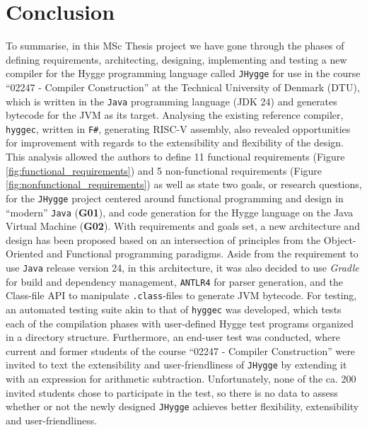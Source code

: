 \chapter{Conclusion}

To summarise, in this MSc Thesis project we have gone through the phases of defining requirements, architecting, designing, implementing
and testing a new compiler for the Hygge programming language called \texttt{JHygge} for use in the course ``02247 - Compiler Construction''\cite{curriculum_02247}
at the Technical University of Denmark (DTU), which is written in the \texttt{Java} programming
language (JDK 24) and generates bytecode for the JVM as its target. Analysing the existing reference compiler, \texttt{hyggec}, written in
\texttt{F\#}, generating RISC-V assembly, also revealed opportunities for improvement with regards to the extensibility and flexibility
of the design. This analysis allowed the authors to define 11 functional requirements (Figure \ref{fig:functional_requirements}) and
5 non-functional requirements (Figure \ref{fig:nonfunctional_requirements}) as well as state two goals, or research questions, for
the \texttt{JHygge} project centered around functional programming and design in ``modern'' \texttt{Java} (\textbf{G01}), and code generation
for the Hygge language on the Java Virtual Machine (\textbf{G02}). With requirements and goals set, a new architecture and design has been proposed
based on an intersection of principles from the Object-Oriented and Functional programming paradigms. Aside from the requirement to use \texttt{Java}
release version 24, in this architecture, it was also decided to use \textit{Gradle}\cite{gradle} for build and dependency management, \texttt{ANTLR4}\cite{antlr4}
for parser generation, and the Class-file API\cite{jep484} to manipulate \texttt{.class}-files to generate JVM bytecode. For testing, an automated
testing suite akin to that of \texttt{hyggec}\cite{hyggec} was developed, which tests each of the compilation phases with user-defined Hygge test
programs organized in a directory structure. Furthermore, an end-user test was conducted, where current and former students of the course
``02247 - Compiler Construction'' were invited to text the extensibility and user-friendliness of \texttt{JHygge} by extending it with an
expression for arithmetic subtraction. Unfortunately, none of the ca. 200 invited students chose to participate in the test, so there is no data 
to assess whether or not the newly designed \texttt{JHygge} achieves better flexibility, extensibility and user-friendliness.
